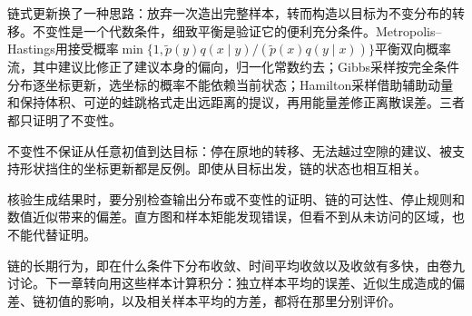 链式更新换了一种思路：放弃一次造出完整样本，转而构造以目标为不变分布的转移。不变性是一个代数条件，细致平衡是验证它的便利充分条件。Metropolis--Hastings用接受概率$\min\{1,\widetilde{p}(y)q(x\mid y)/(\widetilde{p}(x)q(y\mid x))\}$平衡双向概率流，其中建议比修正了建议本身的偏向，归一化常数约去；Gibbs采样按完全条件分布逐坐标更新，选坐标的概率不能依赖当前状态；Hamilton采样借助辅助动量和保持体积、可逆的蛙跳格式走出远距离的提议，再用能量差修正离散误差。三者都只证明了不变性。

不变性不保证从任意初值到达目标：停在原地的转移、无法越过空隙的建议、被支持形状挡住的坐标更新都是反例。即使从目标出发，链的状态也相互相关。

核验生成结果时，要分别检查输出分布或不变性的证明、链的可达性、停止规则和数值近似带来的偏差。直方图和样本矩能发现错误，但看不到从未访问的区域，也不能代替证明。

链的长期行为，即在什么条件下分布收敛、时间平均收敛以及收敛有多快，由卷九讨论。下一章转向用这些样本计算积分：独立样本平均的误差、近似生成造成的偏差、链初值的影响，以及相关样本平均的方差，都将在那里分别评价。

